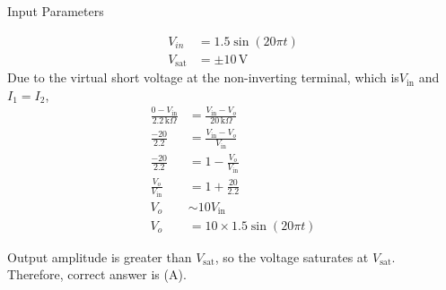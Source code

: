 \documentclass[journal,12pt,twocolumn]{IEEEtran}
\begin{document}
\begin{table}[htbp]
  \centering
  
  \caption{Input Parameters}
  \label{tab:PH.11.table1}
\end{table}
\begin{align}
V_{in} &= 1.5 \sin(20\pi t)\\
V_{\text{sat}} &= \pm 10 \, \text{V}
\end{align}
Due to the virtual short voltage at the non-inverting terminal, which is\( V_{\text{in}} \) and $I_1 = I_2$,\\
\begin{align}
\frac{0 - V_{\text{in}}}{2.2 \, \text{k}\Omega} &= \frac{V_{\text{in}} - V_o}{20 \, \text{k}\Omega}\\
\frac{-20}{2.2} &= \frac{V_{\text{in}} - V_o}{V_{\text{in}}}\\
\frac{-20}{2.2} &= 1 - \frac{V_o}{V_{\text{in}}}\\
\frac{V_o}{V_{\text{in}}} &= 1 + \frac{20}{2.2}\\
V_o &\sim 10 V_{\text{in}}\\
V_o &= 10 \times 1.5 \sin(20\pi t)
\end{align}

Output amplitude is greater than $V_{\text{sat}}$, so the voltage saturates at $V_{\text{sat}}$.\\
Therefore, correct answer is (A).
\end{document}
